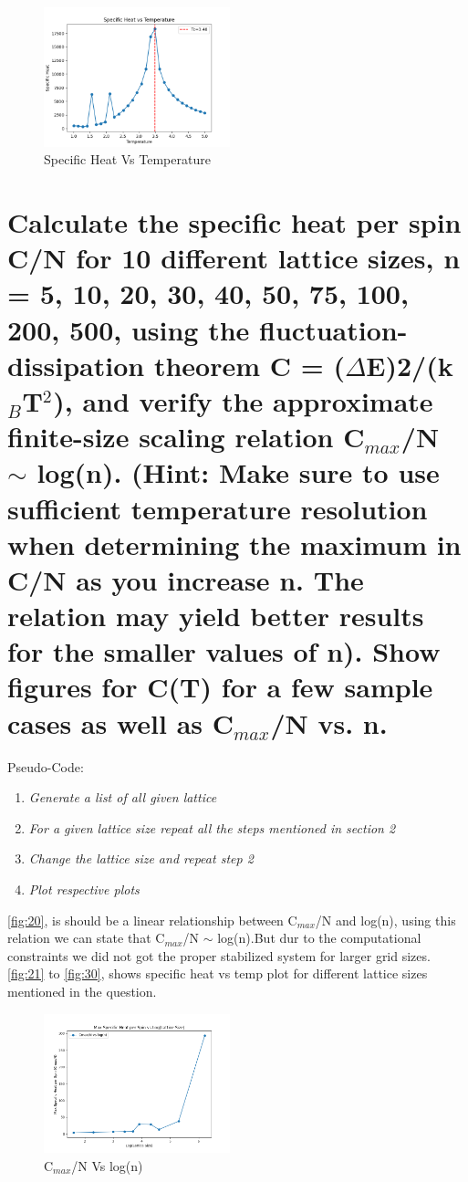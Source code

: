 \documentclass[11pt]{article}
\begin{document}
\begin{figure}[H]
    \centering
    \includegraphics[width=0.48\textwidth, keepaspectratio]{Specific_Heat_vs_Temperature.png}
    \caption{Specific Heat Vs Temperature}
    \label{fig:19}
\end{figure}


\section{Calculate the specific heat per spin C/N for 10 different lattice sizes, n = 5, 10, 20, 30, 40, 50, 75, 100, 200, 500, using the fluctuation-dissipation theorem C = ($\Delta$E)2/(k$_B$T$^2$), and verify the approximate finite-size scaling relation C$_{max}$/N $\sim$ log(n). (Hint: Make sure to use sufficient temperature resolution when determining the maximum in C/N as you increase n. The relation may yield better
results for the smaller values of n). Show figures for C(T) for a few sample cases as well as C$_{max}$/N vs. n.}

Pseudo-Code:
\begin{enumerate}
    \item \textit{Generate a list of all given lattice}
    \item \textit{For a given lattice size repeat all the steps mentioned in section 2}
    \item \textit{Change the lattice size and repeat step 2}
    \item \textit{Plot respective plots}
\end{enumerate}

\autoref{fig:20}, is should be a linear relationship between C$_{max}$/N and log(n), using this relation we can state that C$_{max}$/N $\sim$ log(n).But dur to the computational constraints we did not got the proper stabilized system for larger grid sizes. \autoref{fig:21} to \autoref{fig:30}, shows specific heat vs temp plot for different lattice sizes mentioned in the question.

\begin{figure}[H]
    \centering
    \includegraphics[width=0.48\textwidth, keepaspectratio]{Max_Specific_Heat_per_Spin_vs_Log_Lattice_Size.png}
    \caption{C$_{max}$/N Vs log(n)}
    \label{fig:20}
\end{figure}
\end{document}

